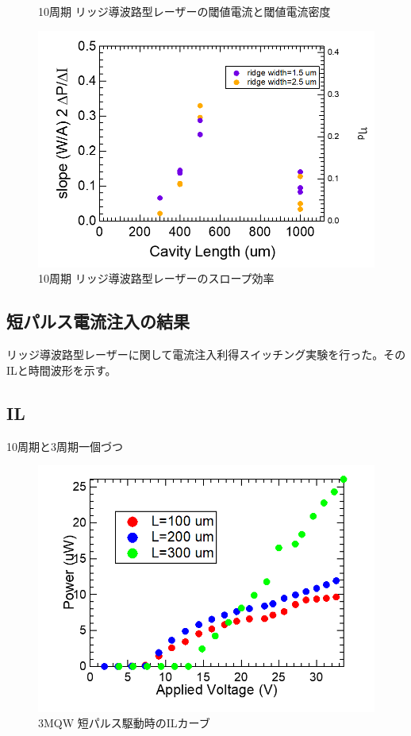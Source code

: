 {\begin{figure}[h]
		\caption{10周期 リッジ導波路型レーザーの閾値電流と閾値電流密度}
		\label{fig:fig_3_2_10QW_ridge_Ith}
\end{figure}
\begin{figure}[h]
	\centering
	\includegraphics[width=15cm]{figure/fig_3_2_10QW_ridge_slope.png}
		\caption{10周期 リッジ導波路型レーザーのスロープ効率}
		\label{fig:fig_3_2_10QW_ridge_slope}
\end{figure}
\clearpage
\subsection{短パルス電流注入の結果}
リッジ導波路型レーザーに関して電流注入利得スイッチング実験を行った。そのILと時間波形を示す。
\subsection{IL}
10周期と3周期一個づつ
\begin{figure}[h]
	\centering
	\includegraphics[width=15cm]{figure/fig_3_2_3QW_ridge_GS_power.png}
		\caption{3MQW 短パルス駆動時のILカーブ}
		\label{fig:fig_3_2_3QW_ridge_GS_power}
\end{figure}

}
